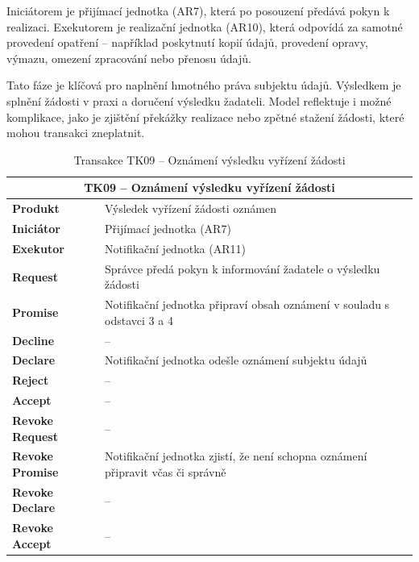 \begin{itemize}
  Iniciátorem je přijímací jednotka (AR7), která po posouzení předává pokyn k realizaci. Exekutorem je realizační jednotka (AR10), která odpovídá za samotné provedení opatření – například poskytnutí kopií údajů, provedení opravy, výmazu, omezení zpracování nebo přenosu údajů.

  Tato fáze je klíčová pro naplnění hmotného práva subjektu údajů. Výsledkem je splnění žádosti v praxi a doručení výsledku žadateli. Model reflektuje i možné komplikace, jako je zjištění překážky realizace nebo zpětné stažení žádosti, které mohou transakci zneplatnit.



  \begin{table}[H]
    \centering
    \renewcommand{\arraystretch}{1.2}
    \begin{tabular}{|p{3.1cm}|p{9.9cm}|}
    \hline
    \multicolumn{2}{|c|}{\textbf{TK09 – Oznámení výsledku vyřízení žádosti}} \\
    \hline
    \textbf{Produkt} & Výsledek vyřízení žádosti oznámen \\
    \hline
    \textbf{Iniciátor} & Přijímací jednotka (AR7) \\
    \hline
    \textbf{Exekutor} & Notifikační jednotka (AR11) \\
    \hline
    \textbf{Request} & Správce předá pokyn k informování žadatele o výsledku žádosti \\
    \hline
    \textbf{Promise} & Notifikační jednotka připraví obsah oznámení v souladu s odstavci 3 a 4 \\
    \hline
    \textbf{Decline} & – \\
    \hline
    \textbf{Declare} & Notifikační jednotka odešle oznámení subjektu údajů \\
    \hline
    \textbf{Reject} & – \\
    \hline
    \textbf{Accept} & – \\
    \hline
    \textbf{Revoke Request} & – \\
    \hline
    \textbf{Revoke Promise} & Notifikační jednotka zjistí, že není schopna oznámení připravit včas či správně \\
    \hline
    \textbf{Revoke Declare} & – \\
    \hline
    \textbf{Revoke Accept} & – \\
    \hline
    \end{tabular}
    \caption{Transakce TK09 – Oznámení výsledku vyřízení žádosti}
  \end{table}
  

\end{itemize}
